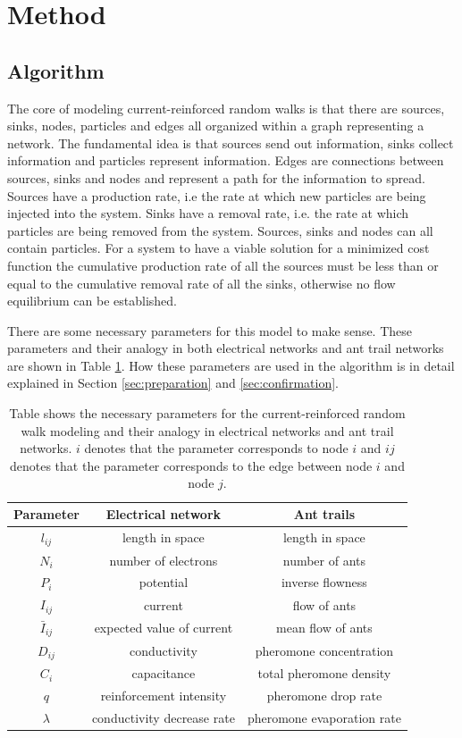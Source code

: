 \section{Method}
\label{sec:method}
\subsection{Algorithm}
The core of modeling current-reinforced random walks is that there are sources, sinks, nodes, particles and edges all organized within a graph representing a network. The fundamental idea is that sources send out information, sinks collect information and particles represent information. Edges are connections between sources, sinks and nodes and represent a path for the information to spread. Sources have a production rate, i.e the rate at which new particles are being injected into the system. Sinks have a removal rate, i.e. the rate at which particles are being removed from the system. Sources, sinks and nodes can all contain particles. For a system to have a viable solution for a minimized cost function the cumulative production rate of all the sources must be less than or equal to the cumulative removal rate of all the sinks, otherwise no flow equilibrium can be established.

There are some necessary parameters for this model to make sense. These parameters and their analogy in both electrical networks and ant trail networks are shown in Table \ref{tab:parameters}. How these parameters are used in the algorithm is in detail explained in Section \ref{sec:preparation} and \ref{sec:confirmation}.

\begin{table}[H]
\renewcommand{\arraystretch}{1.2}
\centering
\caption{Table shows the necessary parameters for the current-reinforced random walk modeling and their analogy in electrical networks and ant trail networks. $i$ denotes that the parameter corresponds to node $i$ and $ij$ denotes that the parameter corresponds to the edge between node $i$ and node $j$.}
\label{tab:parameters}
\begin{tabular}{ c | c | c }                       
	\textbf{Parameter} & \textbf{Electrical network} & \textbf{Ant trails} \\
	\hline
	$l_{ij}$ & length in space & length in space \\
	\hline
	$N_{i}$ & number of electrons & number of ants \\
	\hline	
	$P_{i}$ & potential & inverse flowness \\
	\hline
	$I_{ij}$ & current & flow of ants \\
	\hline
	$\bar{I}_{ij}$ & expected value of current & mean flow of ants \\
	\hline
	$D_{ij}$ & conductivity & pheromone concentration \\
	\hline
	$C_{i}$ & capacitance & total pheromone density \\
	\hline
	$q$ & reinforcement intensity & pheromone drop rate \\
	\hline
	$\lambda$ & conductivity decrease rate & pheromone evaporation rate \\
\end{tabular} 
\end{table}

